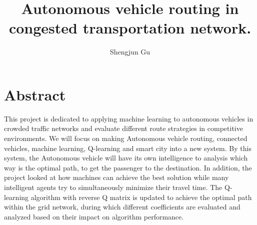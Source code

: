 \documentclass[letterpaper,10pt,draftclsnofoot,onecolumn]{IEEEtran}
\title{Autonomous vehicle routing in congested transportation network.}
\author{Shengjun Gu}
\begin{document}
\maketitle

\section{Abstract}

This project is dedicated to applying machine learning to autonomous vehicles in crowded traffic networks and evaluate different route strategies in competitive environments. We will focus on making Autonomous vehicle routing, connected vehicles, machine learning, Q-learning and smart city into a new system. By this system, the Autonomous vehicle will have its own intelligence to analysis which way is the optimal path, to get the passenger to the destination. In addition, the project looked at how machines can achieve the best solution while many intelligent agents try to simultaneously minimize their travel time. The Q-learning algorithm with reverse Q matrix is updated to achieve the optimal path within the grid network, during which different coefficients are evaluated and analyzed based on their impact on algorithm performance.

\pagebreak
\end{document}
